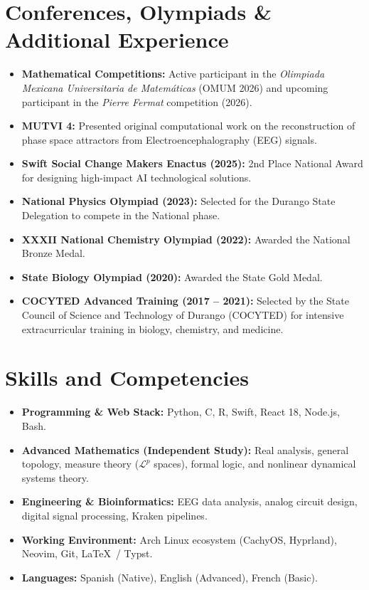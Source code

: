 \documentclass[10pt,letterpaper]{article}
\begin{document}
\section{Conferences, Olympiads \& Additional Experience}
\begin{itemize}
    \item \textbf{Mathematical Competitions:} Active participant in the \textit{Olimpiada Mexicana Universitaria de Matem\'aticas} (OMUM 2026) and upcoming participant in the \textit{Pierre Fermat} competition (2026).
    \item \textbf{MUTVI 4:} Presented original computational work on the reconstruction of phase space attractors from Electroencephalography (EEG) signals.
    \item \textbf{Swift Social Change Makers Enactus (2025):} 2nd Place National Award for designing high-impact AI technological solutions.
    \item \textbf{National Physics Olympiad (2023):} Selected for the Durango State Delegation to compete in the National phase.
    \item \textbf{XXXII National Chemistry Olympiad (2022):} Awarded the National Bronze Medal.
    \item \textbf{State Biology Olympiad (2020):} Awarded the State Gold Medal.
    \item \textbf{COCYTED Advanced Training (2017 -- 2021):} Selected by the State Council of Science and Technology of Durango (COCYTED) for intensive extracurricular training in biology, chemistry, and medicine.
\end{itemize}

\section{Skills and Competencies}
\begin{itemize}
    \item \textbf{Programming \& Web Stack:} Python, C, R, Swift, React 18, Node.js, Bash.
    \item \textbf{Advanced Mathematics (Independent Study):} Real analysis, general topology, measure theory ($\mathcal{L}^p$ spaces), formal logic, and nonlinear dynamical systems theory.
    \item \textbf{Engineering \& Bioinformatics:} EEG data analysis, analog circuit design, digital signal processing, Kraken pipelines.
    \item \textbf{Working Environment:} Arch Linux ecosystem (CachyOS, Hyprland), Neovim, Git, \LaTeX\ / Typst.
    \item \textbf{Languages:} Spanish (Native), English (Advanced), French (Basic).
\end{itemize}
\end{document}
